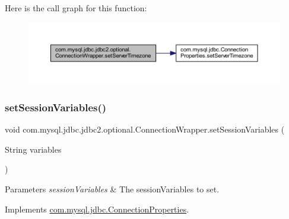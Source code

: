 Here is the call graph for this function\+:
\nopagebreak
\begin{figure}[H]
\begin{center}
\leavevmode
\includegraphics[width=350pt]{classcom_1_1mysql_1_1jdbc_1_1jdbc2_1_1optional_1_1_connection_wrapper_a7163560fbf41796601a4d01ef978dd09_cgraph}
\end{center}
\end{figure}
\mbox{\label{classcom_1_1mysql_1_1jdbc_1_1jdbc2_1_1optional_1_1_connection_wrapper_a7c272bd82ff6771c2ab657ee759dfa00}} 
\subsubsection{\texorpdfstring{set\+Session\+Variables()}{setSessionVariables()}}
{\footnotesize\ttfamily void com.\+mysql.\+jdbc.\+jdbc2.\+optional.\+Connection\+Wrapper.\+set\+Session\+Variables (\begin{DoxyParamCaption}\item[{String}]{variables }\end{DoxyParamCaption})}


\begin{DoxyParams}{Parameters}
{\em session\+Variables} & The session\+Variables to set. \\
\hline
\end{DoxyParams}


Implements \mbox{\hyperlink{interfacecom_1_1mysql_1_1jdbc_1_1_connection_properties_a9883494dfd2b4b2ed6905ecc13cc167d}{com.\+mysql.\+jdbc.\+Connection\+Properties}}.

